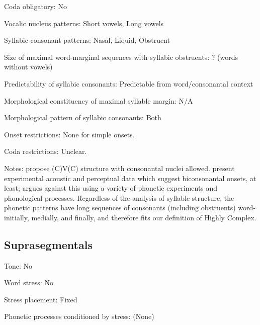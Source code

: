 {\begin{appendixdesc}
\item[Coda obligatory:] No

\item[Vocalic nucleus patterns:] Short vowels, Long vowels

\item[Syllabic consonant patterns:] Nasal, Liquid, Obstruent

\item[Size of maximal word-marginal sequences with syllabic obstruents:] ? (words without vowels)

\item[Predictability of syllabic consonants:] Predictable from word/consonantal context

\item[Morphological constituency of maximal syllable margin:] N/A

\item[Morphological pattern of syllabic consonants:] Both

\item[Onset restrictions:] None for simple onsets.

\item[Coda restrictions:] Unclear.

\item[Notes:] \citet{DellElmedlaoui2002} propose (C)V(C) structure with consonantal nuclei allowed. \citet{PuechLouali1999} present experimental acoustic and perceptual data which suggest biconsonantal onsets, at least; \citet{Ridouane2008} argues against this using a variety of phonetic experiments and phonological processes. Regardless of the analysis of syllable structure, the phonetic patterns have long sequences of consonants (including obstruents) word-initially, medially, and finally, and therefore fits our definition of Highly Complex.
\end{appendixdesc}
\subsection*{Suprasegmentals}
\begin{appendixdesc}
\item[Tone:] No

\item[Word stress:] No

\item[Stress placement:] Fixed

\item[Phonetic processes conditioned by stress:] (None)


\end{appendixdesc}}
